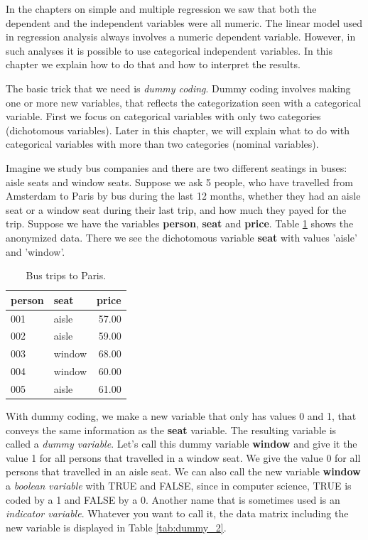 \documentclass[]{book}\usepackage[]{graphicx}\usepackage[]{color}
\begin{document}
In the chapters on simple and multiple regression we saw that both the dependent and the independent variables were all numeric. The linear model used in regression analysis always involves a numeric dependent variable. However, in such analyses it is possible to use categorical independent variables. In this chapter we explain how to do that and how to interpret the results. 

The basic trick that we need is \textit{dummy coding}. Dummy coding involves making one or more new variables, that reflects the categorization seen with a categorical variable. First we focus on categorical variables with only two categories (dichotomous variables). Later in this chapter, we will explain what to do with categorical variables with more than two categories (nominal variables). 

Imagine we study bus companies and there are two different seatings in buses: aisle seats and window seats. Suppose we ask 5 people, who have travelled from Amsterdam to Paris by bus during the last 12 months, whether they had an aisle seat or a window seat during their last trip, and how much they payed for the trip. Suppose we have the variables \textbf{person}, \textbf{seat} and \textbf{price}. Table \ref{tab:dummy_1} shows the anonymized data. There we see the dichotomous variable \textbf{seat} with values 'aisle' and 'window'. 

\begin{table}[ht]
\centering
\caption{Bus trips to Paris.} 
\label{tab:dummy_1}
\begin{tabular}{llr}
  \hline
person & seat & price \\ 
  \hline
001 & aisle & 57.00 \\ 
  002 & aisle & 59.00 \\ 
  003 & window & 68.00 \\ 
  004 & window & 60.00 \\ 
  005 & aisle & 61.00 \\ 
   \hline
\end{tabular}
\end{table}



With dummy coding, we make a new variable that only has values 0 and 1, that conveys the same information as the \textbf{seat} variable. The resulting variable is called a \textit{dummy variable}. Let's call this dummy variable \textbf{window} and give it the value 1 for all persons that travelled in a window seat. We give the value 0 for all persons that travelled in an aisle seat. We can also call the new variable \textbf{window} a \textit{boolean variable} with TRUE and FALSE, since in computer science, TRUE is coded by a 1 and FALSE by a 0. Another name that is sometimes used is an \textit{indicator variable}. Whatever you want to call it, the data matrix including the new variable is displayed in Table \ref{tab:dummy_2}.
\end{document}
